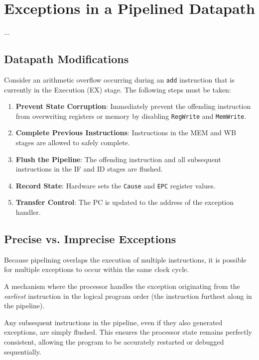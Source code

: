 \section{Exceptions in a Pipelined Datapath}
...
\subsection{Datapath Modifications}

\begin{remark}
Consider an arithmetic overflow occurring during an \texttt{add} instruction that is currently in the Execution (EX) stage. The following steps must be taken:

\begin{enumerate}
    \item \textbf{Prevent State Corruption}: Immediately prevent the offending instruction from overwriting registers or memory by disabling \texttt{RegWrite} and \texttt{MemWrite}.
    \item \textbf{Complete Previous Instructions}: Instructions in the MEM and WB stages are allowed to safely complete.
    \item \textbf{Flush the Pipeline}: The offending instruction and all subsequent instructions in the IF and ID stages are flushed.
    \item \textbf{Record State}: Hardware sets the \texttt{Cause} and \texttt{EPC} register values.
    \item \textbf{Transfer Control}: The PC is updated to the address of the exception handler.
\end{enumerate}

\end{remark}

\subsection{Precise vs. Imprecise Exceptions}
Because pipelining overlaps the execution of multiple instructions, it is possible for multiple exceptions to occur within the same clock cycle.

\begin{definition}
A mechanism where the processor handles the exception originating from the \textit{earliest} instruction in the logical program order (the instruction furthest along in the pipeline).
\end{definition}

\begin{proposition}
Any subsequent instructions in the pipeline, even if they also generated exceptions, are simply flushed. This ensures the processor state remains perfectly consistent, allowing the program to be accurately restarted or debugged sequentially.
\end{proposition}
